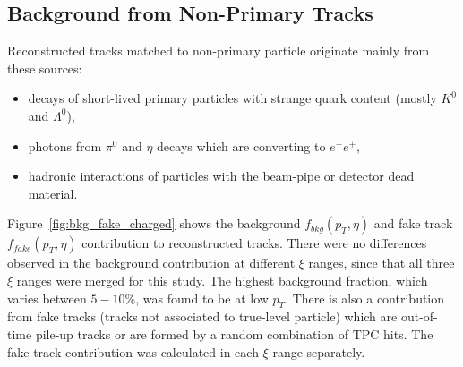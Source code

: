 \subsection{Background from Non-Primary Tracks}\label{section:star_background_primary}
Reconstructed tracks matched to non-primary particle  originate  mainly from these sources:
\begin{itemize}
	\item decays of short-lived primary particles with strange quark content (mostly $K^0$ and $\Lambda^0$),
	\item photons from $\pi^0$ and $\eta$ decays which are converting to $e^-e^+$,
	\item hadronic interactions of particles with the beam-pipe or detector dead material.
\end{itemize} 
Figure~\ref{fig:bkg_fake_charged} shows the background $f_{bkg}\left(p_T,\eta\right)$ and fake track $f_{fake}\left(p_T,\eta\right)$ contribution to reconstructed tracks. There were no differences observed in the background contribution at different $\xi$ ranges, since that all three $\xi$ ranges were merged for this study. The highest background fraction, which varies between $5-10\%$, was found to be at low $p_T$. There is also a contribution from fake tracks (tracks not associated to true-level particle) which are out-of-time pile-up tracks or  are formed by a random combination of TPC hits. The fake track contribution was calculated in each $\xi$ range separately.
